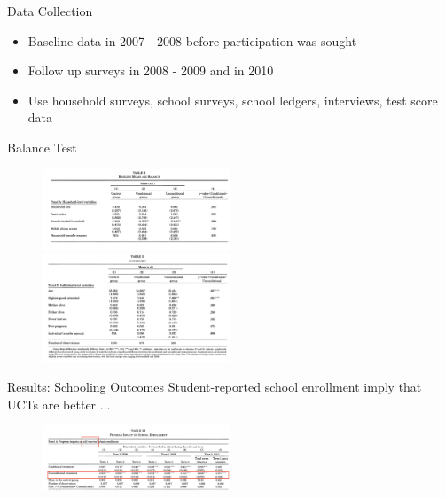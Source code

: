 \documentclass[11pt,notes=hide,aspectratio=169,mathserif]{beamer}
\begin{document}
\begin{frame}{Data Collection}
\begin{itemize}
\item Baseline data in 2007 - 2008 before participation was sought 
\pause \item Follow up surveys in 2008 - 2009 and in 2010 
\pause \item Use household surveys, school surveys, school ledgers, interviews, test score data 
\end{itemize}
\end{frame}

\begin{frame}{Balance Test}
\begin{figure}
\centering
\includegraphics[width=0.5\textwidth]{inputs/table4.png}\\
\vspace{0.0cm} 
\includegraphics[width=0.5\textwidth]{inputs/table5.png}
\end{figure}
\end{frame}

\begin{frame}{Results: Schooling Outcomes}
Student-reported school enrollment imply that UCTs are better ...
\begin{figure}
\centering
\includegraphics[width=0.5\textwidth]{inputs/table6.png}
\end{figure}
\end{frame}
\end{document}
